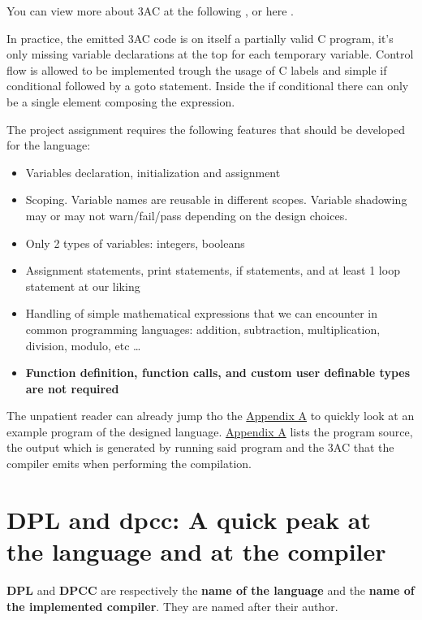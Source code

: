 \documentclass[a4paper]{article}
\newcommand{\urlref}[3][blue]{\href{#2}{\color{#1}{#3}}}%
\begin{document}
You can view more about 3AC at the following \urlref{https://en.wikipedia.org/wiki/Three-address_code}{Wikipedia link}, or here \urlref{https://www.geeksforgeeks.org/three-address-code-compiler/}{Geeks4Geeks link}.

In practice, the emitted 3AC code is on itself a partially valid C program, it's only missing variable
declarations at the top for each temporary variable. Control flow is allowed to be implemented
trough the usage of C labels and simple if conditional followed by a goto statement. Inside
the if conditional there can only be a single element composing the expression.

The project assignment requires the following features that should be developed for the language:

\begin{itemize}
    \item Variables declaration, initialization and assignment
    \item Scoping. Variable names are reusable in different scopes. Variable
        shadowing may or may not warn/fail/pass depending on the design choices.
    \item Only 2 types of variables: integers, booleans
    \item Assignment statements, print statements, if statements, and at least 1 loop statement at our liking
    \item Handling of simple mathematical expressions that we can encounter in common programming
        languages: addition, subtraction, multiplication, division, modulo, etc \dots
    \item \textbf{Function definition, function calls, and custom user definable types are not required}
\end{itemize}

The unpatient reader can already jump tho the \hyperref[appendix_a]{Appendix A} to quickly look at an
example program of the designed language. \hyperref[appendix_a]{Appendix A} lists the program
source, the output which is generated by running said program and the 3AC that the compiler emits
when performing the compilation.

\clearpage

\section{DPL and dpcc: A quick peak at the language and at the compiler}

\textbf{DPL} and \textbf{DPCC} are respectively the \textbf{name of the language} and the
\textbf{name of the implemented compiler}. They are named after their author.
\end{document}
